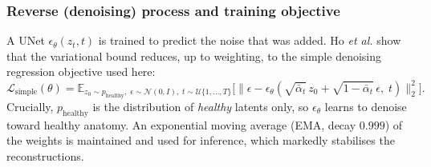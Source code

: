 \documentclass[12pt, a4paper]{article}
\begin{document}
\subsubsection{Reverse (denoising) process and training objective}
A UNet $\epsilon_\theta(z_t, t)$ is trained to predict the noise that was added. Ho \emph{et al.} \cite{ho2020} show that the variational bound reduces, up to weighting, to the simple denoising regression objective used here:
\begin{equation}
    \mathcal{L}_{\text{simple}}(\theta)
    = \mathbb{E}_{z_0\sim p_{\text{healthy}},\;\epsilon\sim\mathcal{N}(0,I),\; t\sim\mathcal{U}\{1,\dots,T\}}
    \Big[\big\|\epsilon - \epsilon_\theta(\sqrt{\bar{\alpha}_t}\,z_0 + \sqrt{1-\bar{\alpha}_t}\,\epsilon,\; t)\big\|_2^2\Big].
    \label{eq:simple}
\end{equation}
Crucially, $p_{\text{healthy}}$ is the distribution of \emph{healthy} latents only, so $\epsilon_\theta$ learns to denoise toward healthy anatomy. An exponential moving average (EMA, decay $0.999$) of the weights is maintained and used for inference, which markedly stabilises the reconstructions.
\end{document}
